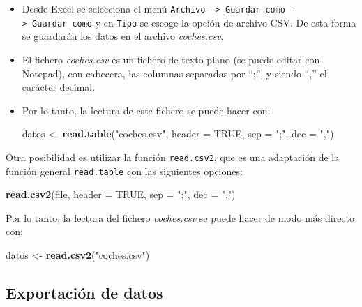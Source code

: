\documentclass[]{book}
\newenvironment{Shaded}{\begin{snugshade}}{\end{snugshade}}
\newcommand{\DataTypeTok}[1]{\textcolor[rgb]{0.13,0.29,0.53}{#1}}
\newcommand{\KeywordTok}[1]{\textcolor[rgb]{0.13,0.29,0.53}{\textbf{#1}}}
\newcommand{\NormalTok}[1]{#1}
\newcommand{\OtherTok}[1]{\textcolor[rgb]{0.56,0.35,0.01}{#1}}
\newcommand{\StringTok}[1]{\textcolor[rgb]{0.31,0.60,0.02}{#1}}
\begin{document}
\begin{itemize}
\item
  Desde Excel se selecciona el menú
  \texttt{Archivo\ -\textgreater{}\ Guardar\ como\ -\textgreater{}\ Guardar\ como} y en \texttt{Tipo} se escoge la opción de
  archivo CSV. De esta forma se guardarán los datos en el archivo
  \emph{coches.csv}.
\item
  El fichero \emph{coches.csv} es un fichero de texto plano (se puede
  editar con Notepad), con cabecera, las columnas separadas por ``;'', y
  siendo ``,'' el carácter decimal.
\item
  Por lo tanto, la lectura de este fichero se puede hacer con:

\begin{Shaded}
\begin{Highlighting}[]
\NormalTok{datos <-}\StringTok{ }\KeywordTok{read.table}\NormalTok{(}\StringTok{"coches.csv"}\NormalTok{, }\DataTypeTok{header =} \OtherTok{TRUE}\NormalTok{, }\DataTypeTok{sep =} \StringTok{";"}\NormalTok{, }\DataTypeTok{dec =} \StringTok{","}\NormalTok{)}
\end{Highlighting}
\end{Shaded}
\end{itemize}

Otra posibilidad es utilizar la función \texttt{read.csv2}, que es
una adaptación de la función general \texttt{read.table} con las siguientes
opciones:

\begin{Shaded}
\begin{Highlighting}[]
\KeywordTok{read.csv2}\NormalTok{(file, }\DataTypeTok{header =} \OtherTok{TRUE}\NormalTok{, }\DataTypeTok{sep =} \StringTok{";"}\NormalTok{, }\DataTypeTok{dec =} \StringTok{","}\NormalTok{)}
\end{Highlighting}
\end{Shaded}

Por lo tanto, la lectura del fichero \emph{coches.csv} se puede hacer de modo
más directo con:

\begin{Shaded}
\begin{Highlighting}[]
\NormalTok{datos <-}\StringTok{ }\KeywordTok{read.csv2}\NormalTok{(}\StringTok{"coches.csv"}\NormalTok{)}
\end{Highlighting}
\end{Shaded}

\hypertarget{exportacion-de-datos}{%
\subsection{Exportación de datos}\label{exportacion-de-datos}}
\end{document}
